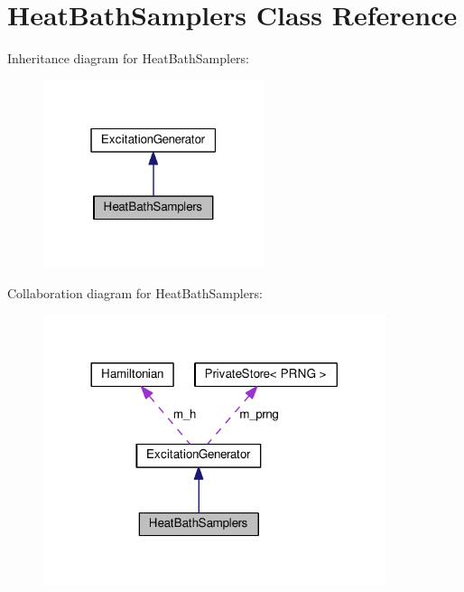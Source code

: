 \hypertarget{classHeatBathSamplers}{}\section{Heat\+Bath\+Samplers Class Reference}
\label{classHeatBathSamplers}


Inheritance diagram for Heat\+Bath\+Samplers\+:\nopagebreak
\begin{figure}[H]
\begin{center}
\leavevmode
\includegraphics[width=183pt]{classHeatBathSamplers__inherit__graph}
\end{center}
\end{figure}


Collaboration diagram for Heat\+Bath\+Samplers\+:\nopagebreak
\begin{figure}[H]
\begin{center}
\leavevmode
\includegraphics[width=284pt]{classHeatBathSamplers__coll__graph}
\end{center}
\end{figure}
